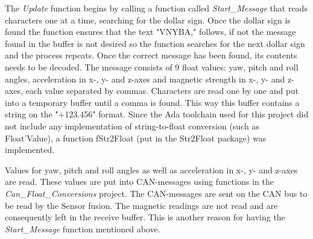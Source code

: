 The \emph{Update} function begins by calling a function called \newline
\emph{Start\_Message} that reads characters one at a time, searching for the dollar sign. Once the dollar sign is found the function ensures that the text "VNYBA," follows, if not the message found in the buffer is not desired so the function searches for the next dollar sign and the process repeats. \newline
Once the correct message has been found, its contents needs to be decoded. The message consists of 9 float values: yaw, pitch and roll angles, acceleration in x-, y- and z-axes and magnetic strength in x-, y- and z-axes, each value separated by commas. \newline
Characters are read one by one and put into a temporary buffer until a comma is found. This way this buffer contains a string on the "+123.456" format. Since the Ada toolchain used for this project did not include any implementation of string-to-float conversion (such as Float'Value), a function fStr2Float (put in the Str2Float package) was implemented.

Values for yaw, pitch and roll angles as well as acceleration in x-, y- and z-axes are read. These values are put into CAN-messages using functions in the \emph{Can\_Float\_Conversions} project. The CAN-messages are sent on the CAN bus to be read by the Sensor fusion. \newline
The magnetic readings are not read and are consequently left in the receive buffer. This is another reason for having the \emph{Start\_Message} function mentioned above.

